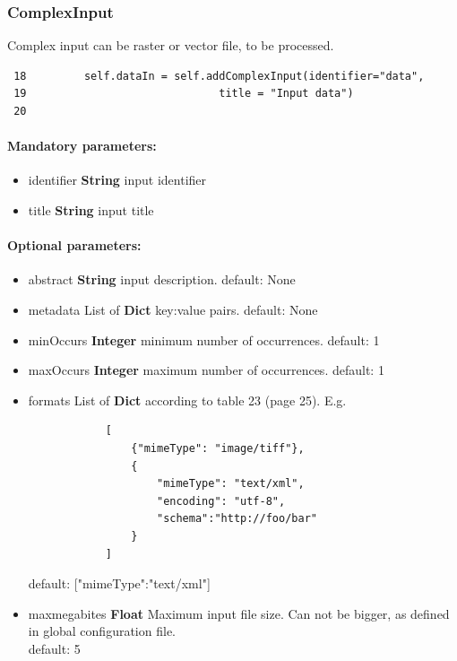 \documentclass[a4paper,11pt]{report}
\begin{document}
\subsubsection{ComplexInput}
Complex input can be raster or vector file, to be processed. 

\begin{verbatim}
 18         self.dataIn = self.addComplexInput(identifier="data",
 19                              title = "Input data")
 20 
\end{verbatim}

\paragraph{Mandatory parameters:}
\begin{itemize}
    \item identifier \textbf{String} input identifier
    \item title \textbf{String} input title
\end{itemize}

\paragraph{Optional parameters:}
\begin{itemize}
\item abstract \textbf{String} input description.
        default: None
\item metadata List of \textbf{Dict} {key:value} pairs.
        default: None
\item minOccurs \textbf{Integer} minimum number of occurrences.
        default: 1
\item maxOccurs \textbf{Integer} maximum number of occurrences.
        default: 1
\item formats List of \textbf{Dict} according to table 23 (page 25). E.g.
    \begin{verbatim}
            [
                {"mimeType": "image/tiff"},
                {
                    "mimeType": "text/xml",
                    "encoding": "utf-8",
                    "schema":"http://foo/bar"
                }
            ]
    \end{verbatim}
        default: [{"mimeType":"text/xml"}]
\item maxmegabites \textbf{Float} Maximum input file size. Can not be bigger, as
        defined in global configuration file.\\
        default: 5
\end{itemize}
\end{document}

